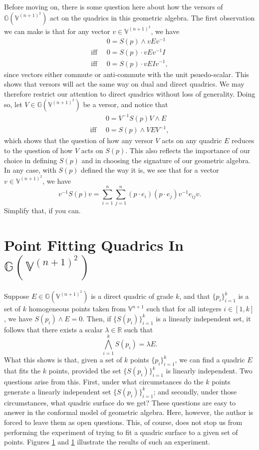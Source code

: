 \documentclass{birkjour}
\theoremstyle{definition}
\theoremstyle{remark}
\numberwithin{equation}{section}
\newcommand{\G}{\mathbb{G}}
\newcommand{\V}{\mathbb{V}}
\newcommand{\R}{\mathbb{R}}
\begin{document}
Before moving on, there is some question here about how the versors
of $\G(\V^{(n+1)^2})$ act on the quadrics in this geometric algebra.
The first observation we can make is that for any vector $v\in\V^{(n+1)^2}$,
we have
\begin{align}
 & 0 = S(p)\wedge vEv^{-1} \\
\mbox{iff}\;\; & 0 = S(p)\cdot vEv^{-1}I \\
\mbox{iff}\;\; & 0 = S(p)\cdot vEIv^{-1},
\end{align}
since vectors either commute or anti-commute with the unit psuedo-scalar.  This shows that
versors will act the same way on dual and direct quadrics.  We may therefore restrict
our attention to direct quadrics without loss of generality.  Doing so, let $V\in\G(\V^{(n+1)^2})$
be a versor, and notice that
\begin{align}
 & 0 = V^{-1}S(p)V\wedge E \\
\mbox{iff}\;\;& 0 = S(p)\wedge VEV^{-1},
\end{align}
which shows that the question of how any versor $V$ acts on any quadric $E$ reduces
to the question of how $V$ acts on $S(p)$.  This also reflects the importance of our
choice in defining $S(p)$ and in choosing the signature of our geometric algebra.
In any case, with $S(p)$ defined the way it is, we see that for a vector $v\in\V^{(n+1)^2}$,
we have
\begin{equation}
v^{-1}S(p)v = \sum_{i=1}^n\sum_{j=1}^n(p\cdot e_i)(p\cdot e_j)v^{-1}e_{ij}v.
\end{equation}
Simplify that, if you can.

\section{Point Fitting Quadrics In $\G(\V^{(n+1)^2})$}

Suppose $E\in\G(\V^{(n+1)^2})$ is a direct quadric of grade $k$, and
that $\{p_i\}_{i=1}^k$ is a set of $k$ homogeneous points taken from $\V^{n+1}$
such that for all integers $i\in[1,k]$, we have $S(p_i)\wedge E=0$.  Then,
if $\{S(p_i)\}_{i=1}^k$ is a linearly independent set, it follows that
there exists a scalar $\lambda\in\R$ such that
\begin{equation}
\bigwedge_{i=1}^k S(p_i) = \lambda E.
\end{equation}
What this shows is that, given a set of $k$ points $\{p_i\}_{i=1}^k$, we can find a quadric $E$
that fits the $k$ points, provided the set $\{S(p_i)\}_{i=1}^k$ is linearly
independent.  Two questions
arise from this.  First, under what circumstances do the $k$ points generate
a linearly independent set $\{S(p_i)\}_{i=1}^k$; and secondly, under
those circumstances, what quadric surface do we get?  These questions
are easy to answer in the conformal model of geometric algebra.  Here, however,
the author is forced to leave them as open questions.  This, of course, does
not stop us from performing the experiment of trying to fit a quadric surface
to a given set of points.  Figures \ref{} and \ref{} illustrate the results
of such an experiment.
\end{document}
